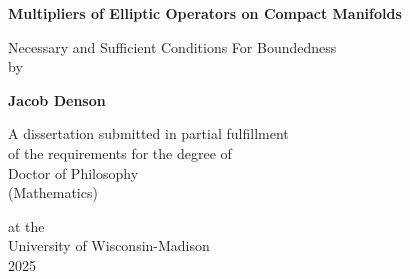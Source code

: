 \begin{titlepage}
    \begin{center}
        \vspace*{1cm}
        
        \Huge
        \textbf{Multipliers of Elliptic Operators on Compact Manifolds}
        
        \vspace{0.5cm}
        \LARGE
        {Necessary and Sufficient Conditions For Boundedness}%
        \vspace{1em}
        \\
        by\\
        \vspace{1em}
    
        \textbf{Jacob Denson}
        
        \vfill
        
        A dissertation submitted in partial fulfillment\\
        of the requirements for the degree of\\
        Doctor of Philosophy\\
        (Mathematics)\\
    
        
        \vspace{1.8cm}

        
        \Large
        at the\\University of Wisconsin-Madison\\
        2025\\
        \vspace{1.0cm}
        
    \end{center}
    
\end{titlepage}